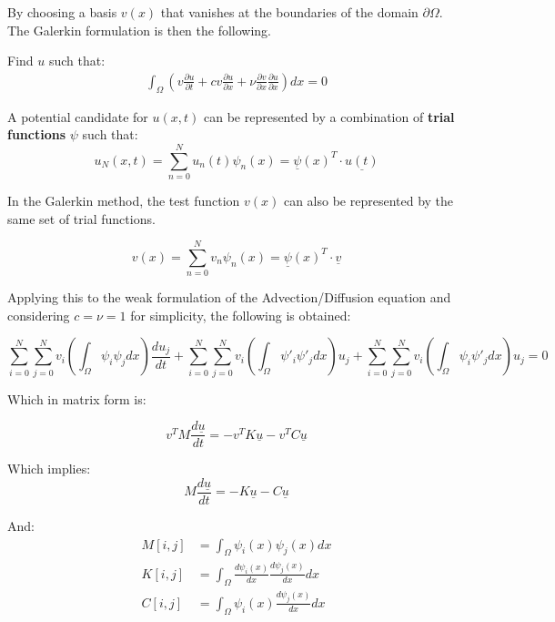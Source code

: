 \documentclass[
  a4paper,
  10pt]{article}
\begin{document}
By choosing a basis \(v(x)\) that vanishes at the boundaries of the
domain \(\partial\Omega\). The Galerkin formulation is then the
following.

Find \(u\) such that: \begin{align}
\int_{\Omega} (v\frac{\partial u}{\partial t} + cv\frac{\partial u}{\partial x} + \nu\frac{\partial v}{\partial x}\frac{\partial u}{\partial x})dx = 0
\end{align}

A potential candidate for \(u(x,t)\) can be represented by a combination
of \textbf{trial functions} \(\psi\) such that: \begin{equation}
    u_N(x,t) = \sum_{n=0}^N u_n(t) \psi_n(x) = \underline{\psi}(x)^T \cdot \underline{u(t)}
\end{equation}

In the Galerkin method, the test function \(v(x)\) can also be
represented by the same set of trial functions.

\begin{equation}
    v(x) = \sum_{n=0}^N v_n \psi_n(x) = \underline{\psi}(x)^T \cdot \underline{v}
\end{equation}

Applying this to the weak formulation of the Advection/Diffusion
equation and considering \(c=\nu=1\) for simplicity, the following is
obtained:

\begin{equation}
 \sum_{i=0}^{N}\sum_{j=0}^{N} v_i( \int_{\Omega}\psi_{i}\psi_{j}dx)\frac{du_j}{dt}+\sum_{i=0}^{N}\sum_{j=0}^{N} v_i( \int_{\Omega}\psi'_{i}\psi'_{j}dx)u_j+\sum_{i=0}^{N}\sum_{j=0}^{N} v_i( \int_{\Omega}\psi_{i}\psi'_{j}dx)u_j=0
\end{equation}

Which in matrix form is:

\begin{equation}
v^{T}M\frac{d\underline{u}}{dt}=-v^{T}K\underline{u}-v^{T}C\underline{u}
\end{equation}

Which implies: \begin{equation}
M\frac{d\underline{u}}{dt}=-K\underline{u}-C\underline{u}
\end{equation}

And: \begin{align}
M[i,j]&=\int_{\Omega}\psi_i(x)\psi_j(x)dx \\
K[i,j]&=\int_{\Omega}\frac{d\psi_i(x)}{dx}\frac{d\psi_j(x)}{dx}dx \\
C[i,j] &= \int_{\Omega}\psi_i(x)\frac{d\psi_j(x)}{dx}dx \\
\end{align}
\end{document}
